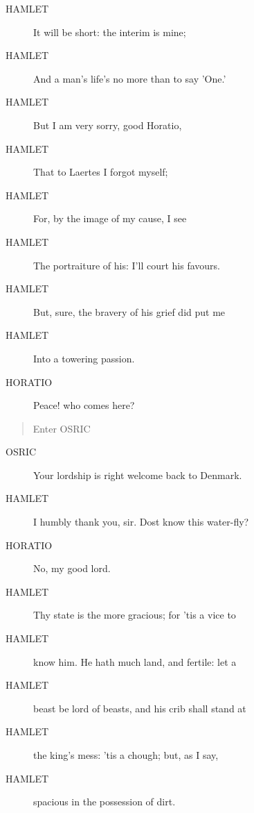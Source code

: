 \documentclass{article}
\begin{document}
\begin{description}
            
\item[HAMLET] It will be short: the interim is mine;
\item[HAMLET] And a man's life's no more than to say 'One.'
\item[HAMLET] But I am very sorry, good Horatio,
\item[HAMLET] That to Laertes I forgot myself;
\item[HAMLET] For, by the image of my cause, I see
\item[HAMLET] The portraiture of his: I'll court his favours.
\item[HAMLET] But, sure, the bravery of his grief did put me
\item[HAMLET] Into a towering passion.
\end{description}
          
\begin{description}
            
\item[HORATIO] Peace! who comes here?
\end{description}
          
\begin{quote}
Enter OSRIC
\end{quote}
          
\begin{description}
            
\item[OSRIC] Your lordship is right welcome back to Denmark.
\end{description}
          
\begin{description}
            
\item[HAMLET] I humbly thank you, sir. Dost know this water-fly?
\end{description}
          
\begin{description}
            
\item[HORATIO] No, my good lord.
\end{description}
          
\begin{description}
            
\item[HAMLET] Thy state is the more gracious; for 'tis a vice to
\item[HAMLET] know him. He hath much land, and fertile: let a
\item[HAMLET] beast be lord of beasts, and his crib shall stand at
\item[HAMLET] the king's mess: 'tis a chough; but, as I say,
\item[HAMLET] spacious in the possession of dirt.
\end{description}
          
\end{document}
